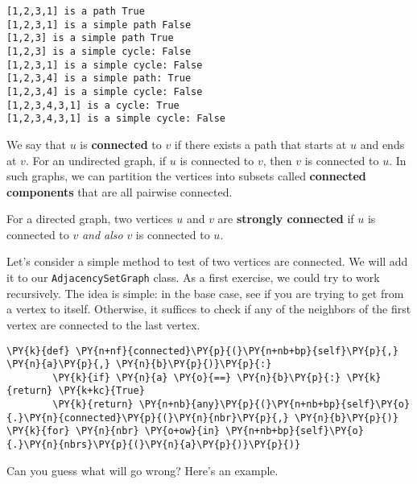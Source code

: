 \begin{Verbatim}
[1,2,3,1] is a path True
[1,2,3,1] is a simple path False
[1,2,3] is a simple path True
[1,2,3] is a simple cycle: False
[1,2,3,1] is a simple cycle: False
[1,2,3,4] is a simple path: True
[1,2,3,4] is a simple cycle: False
[1,2,3,4,3,1] is a cycle: True
[1,2,3,4,3,1] is a simple cycle: False

\end{Verbatim}


We say that $u$ is \textbf{connected} to $v$ if there exists a path that starts at $u$ and ends at $v$.
For an undirected graph, if $u$ is connected to $v$, then $v$ is connected to $u$.
In such graphs, we can partition the vertices into subsets called \textbf{connected components} that are all pairwise connected.  


For a directed graph, two vertices $u$ and $v$ are \textbf{strongly connected} if $u$ is connected to $v$ \emph{and also} $v$ is connected to $u$.


Let's consider a simple method to test of two vertices are connected.
We will add it to our \texttt{AdjacencySetGraph} class.  As a first exercise, we could try to work recursively.  The idea is simple: in the base case, see if you are trying to get from a vertex to itself.  Otherwise, it suffices to check if any of the neighbors of the first vertex are connected to the last vertex.

\begin{Verbatim}[commandchars=\\\{\}]
    \PY{k}{def} \PY{n+nf}{connected}\PY{p}{(}\PY{n+nb+bp}{self}\PY{p}{,} \PY{n}{a}\PY{p}{,} \PY{n}{b}\PY{p}{)}\PY{p}{:}
        \PY{k}{if} \PY{n}{a} \PY{o}{==} \PY{n}{b}\PY{p}{:} \PY{k}{return} \PY{k+kc}{True}
        \PY{k}{return} \PY{n+nb}{any}\PY{p}{(}\PY{n+nb+bp}{self}\PY{o}{.}\PY{n}{connected}\PY{p}{(}\PY{n}{nbr}\PY{p}{,} \PY{n}{b}\PY{p}{)} \PY{k}{for} \PY{n}{nbr} \PY{o+ow}{in} \PY{n+nb+bp}{self}\PY{o}{.}\PY{n}{nbrs}\PY{p}{(}\PY{n}{a}\PY{p}{)}\PY{p}{)}
\end{Verbatim}



Can you guess what will go wrong?
Here's an example.


